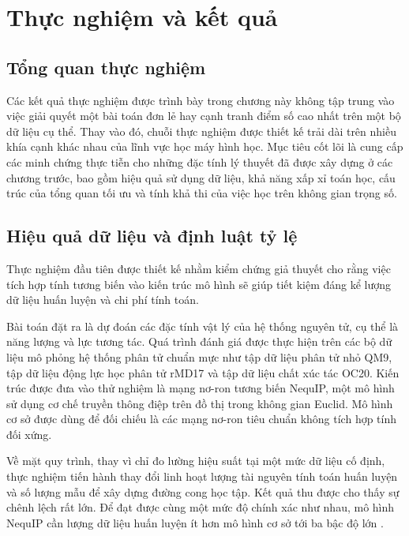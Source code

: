 \section{Thực nghiệm và kết quả}
\label{sec:thuc-nghiem}

\subsection{Tổng quan thực nghiệm}
\label{subsec:tong-quan-thuc-nghiem}

Các kết quả thực nghiệm được trình bày trong chương này không tập trung vào việc giải quyết một bài toán đơn lẻ hay cạnh tranh điểm số cao nhất trên một bộ dữ liệu cụ thể. Thay vào đó, chuỗi thực nghiệm được thiết kế trải dài trên nhiều khía cạnh khác nhau của lĩnh vực học máy hình học. Mục tiêu cốt lõi là cung cấp các minh chứng thực tiễn cho những đặc tính lý thuyết đã được xây dựng ở các chương trước, bao gồm hiệu quả sử dụng dữ liệu, khả năng xấp xỉ toán học, cấu trúc của tổng quan tối ưu và tính khả thi của việc học trên không gian trọng số.

\subsection{Hiệu quả dữ liệu và định luật tỷ lệ}
\label{subsec:hieu-qua-du-lieu}

Thực nghiệm đầu tiên được thiết kế nhằm kiểm chứng giả thuyết cho rằng việc tích hợp tính tương biến vào kiến trúc mô hình sẽ giúp tiết kiệm đáng kể lượng dữ liệu huấn luyện và chi phí tính toán.

Bài toán đặt ra là dự đoán các đặc tính vật lý của hệ thống nguyên tử, cụ thể là năng lượng và lực tương tác. Quá trình đánh giá được thực hiện trên các bộ dữ liệu mô phỏng hệ thống phân tử chuẩn mực như tập dữ liệu phân tử nhỏ QM9, tập dữ liệu động lực học phân tử rMD17 và tập dữ liệu chất xúc tác OC20. Kiến trúc được đưa vào thử nghiệm là mạng nơ-ron tương biến NequIP, một mô hình sử dụng cơ chế truyền thông điệp trên đồ thị trong không gian Euclid. Mô hình cơ sở được dùng để đối chiếu là các mạng nơ-ron tiêu chuẩn không tích hợp tính đối xứng.

Về mặt quy trình, thay vì chỉ đo lường hiệu suất tại một mức dữ liệu cố định, thực nghiệm tiến hành thay đổi linh hoạt lượng tài nguyên tính toán huấn luyện và số lượng mẫu để xây dựng đường cong học tập. Kết quả thu được cho thấy sự chênh lệch rất lớn. Để đạt được cùng một mức độ chính xác như nhau, mô hình NequIP cần lượng dữ liệu huấn luyện ít hơn mô hình cơ sở tới ba bậc độ lớn \cite{batzner2022nequip}. 

